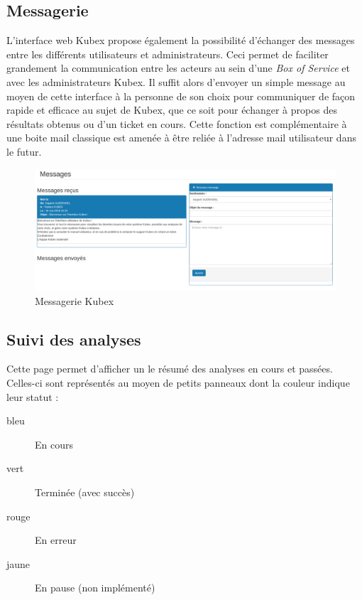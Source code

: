 \documentclass[a4paper]{report}
\begin{document}
\subsection{Messagerie}
\label{subsec:messages}

L'interface web Kubex propose également la possibilité d'échanger des messages entre les différents utilisateurs et administrateurs. Ceci permet de faciliter grandement la communication entre les acteurs au sein d'une \emph{Box of Service} et avec les administrateurs Kubex. Il suffit alors d'envoyer un simple message au moyen de cette interface à la personne de son choix pour communiquer de façon rapide et efficace au sujet de Kubex, que ce soit pour échanger à propos des résultats obtenus ou d'un  ticket en cours. Cette fonction est complémentaire à une boite mail classique est amenée à être reliée à l'adresse mail utilisateur dans le futur.

\begin{figure}[h]
	\includegraphics[width=\textwidth]{images/messages.png}
	\caption{\label{fig:messages} Messagerie Kubex}
\end{figure}

\subsection{Suivi des analyses}
\label{subsec:last_tasks}

Cette page permet d'afficher un le résumé des analyses en cours et passées. Celles-ci sont représentés au moyen de petits panneaux dont la couleur indique leur statut :

\begin{description}
	\item[bleu] En cours
	\item[vert] Terminée (avec succès)
	\item[rouge] En erreur
	\item[jaune] En pause (non implémenté)
\end{description}
\end{document}

